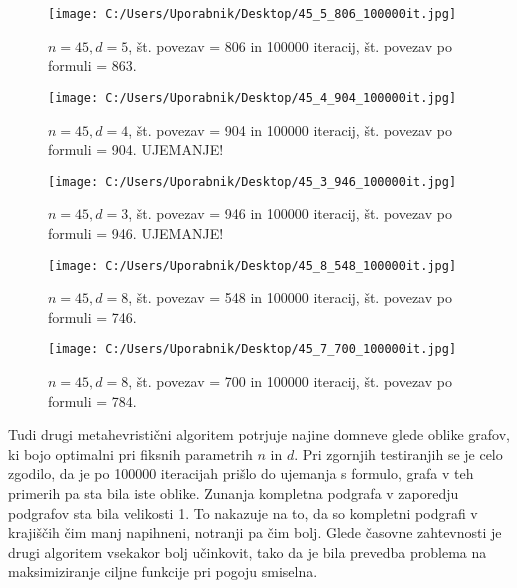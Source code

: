 \documentclass[12pt,a4paper]{amsart}
\theoremstyle{definition} %
\theoremstyle{plain} %
\begin{document}
\begin{figure}[h]
       \centering
       \texttt{[image: C:/Users/Uporabnik/Desktop/45\_5\_806\_100000it.jpg]} 
       \caption{$n = 45, d = 5$, št. povezav = 806 in 100000 iteracij, št. povezav po formuli = 863.}
       \label{fig:slika3}
   \end{figure}

   \begin{figure}[h]
       \centering
       \texttt{[image: C:/Users/Uporabnik/Desktop/45\_4\_904\_100000it.jpg]} 
       \caption{$n = 45, d = 4$, št. povezav = 904 in 100000 iteracij, št. povezav po formuli = 904. UJEMANJE!}
       \label{fig:slika3}
   \end{figure}

   \begin{figure}[h]
       \centering
       \texttt{[image: C:/Users/Uporabnik/Desktop/45\_3\_946\_100000it.jpg]} 
       \caption{$n = 45, d = 3$, št. povezav = 946 in 100000 iteracij, št. povezav po formuli = 946. UJEMANJE!}
       \label{fig:slika3}
   \end{figure}

   \begin{figure}[h]
       \centering
       \texttt{[image: C:/Users/Uporabnik/Desktop/45\_8\_548\_100000it.jpg]} 
       \caption{$n = 45, d = 8$, št. povezav = 548 in 100000 iteracij, št. povezav po formuli = 746.}
       \label{fig:slika3}
   \end{figure}

   \begin{figure}[h]
       \centering
       \texttt{[image: C:/Users/Uporabnik/Desktop/45\_7\_700\_100000it.jpg]} 
       \caption{$n = 45, d = 8$, št. povezav = 700 in 100000 iteracij, št. povezav po formuli = 784.}
       \label{fig:slika3}
   \end{figure}

\pagebreak

\noindent Tudi drugi metahevristični algoritem potrjuje najine domneve glede oblike grafov, ki bojo optimalni pri fiksnih parametrih
$n$ in $d$. Pri zgornjih testiranjih se je celo zgodilo, da je po 100000 iteracijah prišlo do ujemanja s formulo, grafa v teh primerih pa sta
bila iste oblike. Zunanja kompletna podgrafa v zaporedju podgrafov sta bila velikosti 1. To nakazuje na to, da so kompletni podgrafi v krajiščih
čim manj napihneni, notranji pa čim bolj. Glede časovne zahtevnosti je drugi algoritem vsekakor bolj učinkovit, tako da je bila prevedba problema 
na maksimiziranje ciljne funkcije pri pogoju smiselna.
\end{document}
